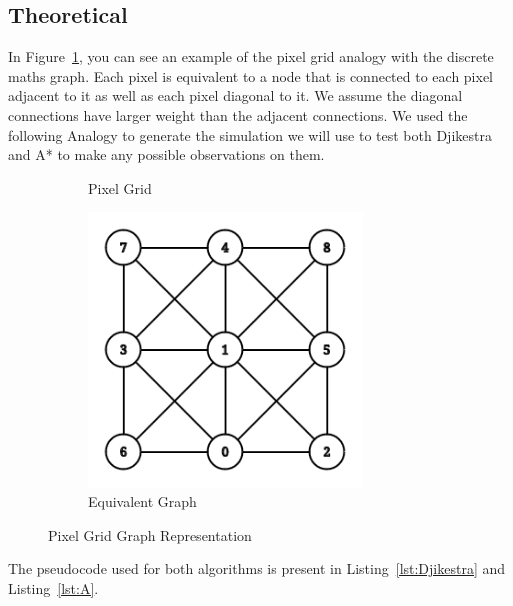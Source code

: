 \documentclass[twocolumn]{article}
\begin{document}
\subsection{Theoretical}
In Figure~\ref{fig:test}, you can see an example of the pixel grid analogy with the discrete maths graph. Each pixel is equivalent to a node that is connected to each pixel adjacent to it as well as each pixel diagonal to it. We assume the diagonal connections have larger weight than the adjacent connections. We used the following Analogy to generate the simulation we will use to test both Djikestra and A* to make any possible observations on them.
\begin{figure}[H]
    \centering
    \begin{subfigure}{0.235\textwidth}
        \centering
        \caption{Pixel Grid}
    \end{subfigure}
    \hfill
    \begin{subfigure}{0.235\textwidth}
        \centering
          \includegraphics[width=0.8\textwidth]{figures/graph.png}
        \caption{Equivalent Graph}
    \end{subfigure}
    \caption{Pixel Grid Graph Representation}
    \label{fig:test}
\end{figure}
The pseudocode used for both algorithms is present in Listing~\ref{lst:Djikestra} and Listing~\ref{lst:A}. 
\end{document}
